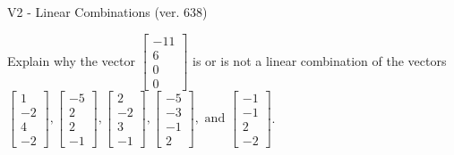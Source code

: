 \begin{exercise}
  \begin{exerciseTitle}V2 - Linear Combinations (ver. 638)\end{exerciseTitle}
  \begin{exerciseStatement}
    Explain why the vector \(\left[\begin{array}{c}
-11 \\
6 \\
0 \\
0
\end{array}\right]\)  is or is not a linear 
	combination of the vectors \(\left[\begin{array}{c}
1 \\
-2 \\
4 \\
-2
\end{array}\right] , \left[\begin{array}{c}
-5 \\
2 \\
2 \\
-1
\end{array}\right] , \left[\begin{array}{c}
2 \\
-2 \\
3 \\
-1
\end{array}\right] , \left[\begin{array}{c}
-5 \\
-3 \\
-1 \\
2
\end{array}\right] , \text{ and } \left[\begin{array}{c}
-1 \\
-1 \\
2 \\
-2
\end{array}\right]\).
	



\end{exerciseStatement}
\end{exercise}
